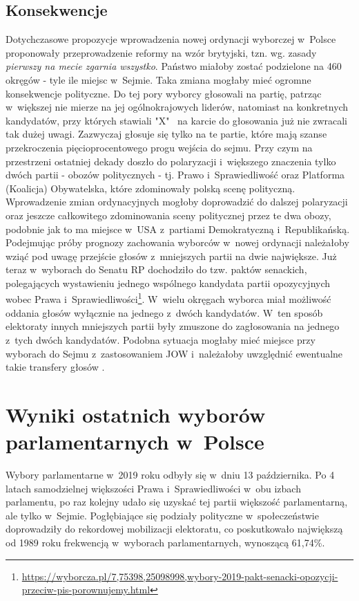 \subsection{Konsekwencje}
Dotychczasowe propozycje wprowadzenia nowej ordynacji wyborczej w~Polsce proponowały przeprowadzenie reformy na wzór brytyjski, tzn. wg. zasady \textit{pierwszy na mecie zgarnia wszystko}. Państwo miałoby zostać podzielone na 460 okręgów - tyle ile miejsc w~Sejmie. Taka zmiana mogłaby mieć ogromne konsekwencje polityczne. Do tej pory wyborcy głosowali na partię, patrząc w~większej nie mierze na jej ogólnokrajowych liderów, natomiast na konkretnych kandydatów, przy których stawiali "X" \ na karcie do głosowania już nie zwracali tak dużej uwagi. Zazwyczaj głosuje się tylko na te partie, które mają szanse przekroczenia pięcioprocentowego progu wejścia do sejmu. Przy czym na przestrzeni ostatniej dekady doszło do polaryzacji i~większego znaczenia tylko dwóch partii - obozów politycznych - tj. Prawo i~Sprawiedliwość oraz Platforma (Koalicja) Obywatelska, które zdominowały polską scenę polityczną. Wprowadzenie zmian ordynacyjnych mogłoby doprowadzić do dalszej polaryzacji oraz jeszcze całkowitego zdominowania sceny politycznej przez te dwa obozy, podobnie jak to ma miejsce w~USA z~partiami Demokratyczną i~Republikańską.
Podejmując próby prognozy zachowania wyborców w~nowej ordynacji należałoby wziąć pod uwagę przejście głosów z~mniejszych partii na dwie największe. Już teraz w~wyborach do Senatu RP dochodziło do tzw. paktów senackich, polegających wystawieniu jednego wspólnego kandydata partii opozycyjnych wobec Prawa i~Sprawiedliwości\footnote{\url{https://wyborcza.pl/7,75398,25098998,wybory-2019-pakt-senacki-opozycji-przeciw-pis-porownujemy.html}}. W~wielu okręgach wyborca miał możliwość oddania głosów wyłącznie na jednego z~dwóch kandydatów. W~ten sposób elektoraty innych mniejszych partii były zmuszone do zagłosowania na jednego z~tych dwóch kandydatów. Podobna sytuacja mogłaby mieć miejsce przy wyborach do Sejmu z~zastosowaniem JOW i~należałoby uwzględnić ewentualne takie transfery głosów \cite{Wolnicki}.

\section{Wyniki ostatnich wyborów parlamentarnych w~Polsce}

Wybory parlamentarne w~2019 roku odbyły się w~dniu 13 października. Po 4 latach samodzielnej większości Prawa i~Sprawiedliwości w~obu izbach parlamentu, po raz kolejny udało się uzyskać tej partii większość parlamentarną, ale tylko w~Sejmie. Pogłębiające się podziały polityczne w~społeczeństwie doprowadziły do rekordowej mobilizacji elektoratu, co poskutkowało największą od 1989 roku frekwencją w~wyborach parlamentarnych, wynoszącą 61,74\%.

